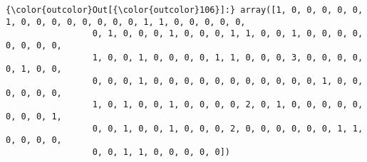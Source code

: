 \documentclass[11pt]{article}
\begin{document}
\begin{Verbatim}[commandchars=\\\{\}]
{\color{outcolor}Out[{\color{outcolor}106}]:} array([1, 0, 0, 0, 0, 0, 1, 0, 0, 0, 0, 0, 0, 0, 0, 1, 1, 0, 0, 0, 0, 0,
                 0, 1, 0, 0, 0, 1, 0, 0, 0, 1, 1, 0, 0, 1, 0, 0, 0, 0, 0, 0, 0, 0,
                 1, 0, 0, 1, 0, 0, 0, 0, 1, 1, 0, 0, 0, 3, 0, 0, 0, 0, 0, 1, 0, 0,
                 0, 0, 0, 1, 0, 0, 0, 0, 0, 0, 0, 0, 0, 0, 0, 1, 0, 0, 0, 0, 0, 0,
                 1, 0, 1, 0, 0, 1, 0, 0, 0, 0, 2, 0, 1, 0, 0, 0, 0, 0, 0, 0, 0, 1,
                 0, 0, 1, 0, 0, 1, 0, 0, 0, 2, 0, 0, 0, 0, 0, 0, 1, 1, 0, 0, 0, 0,
                 0, 0, 1, 1, 0, 0, 0, 0, 0])
\end{Verbatim}
            

    
    
    
    
\end{document}
